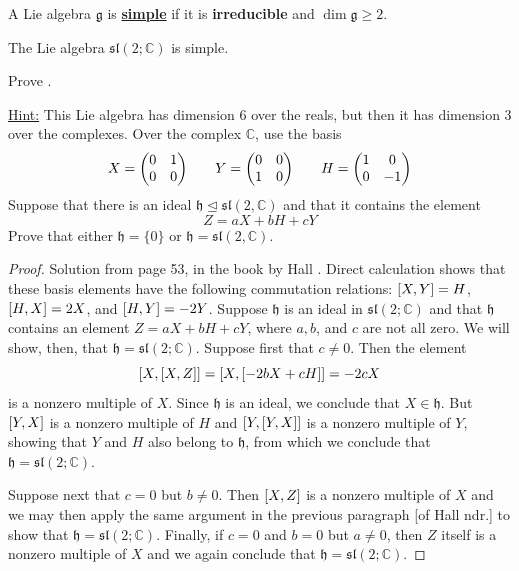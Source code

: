 \documentclass[../main.tex]{subfiles}
\begin{document}
\begin{definition}
A Lie algebra $\mathfrak{g}$ is \underline{\textbf{simple}} if it is \textbf{irreducible} and $\dim\mathfrak{g}\geq 2$.
\end{definition}
\begin{proposition}
The Lie algebra $\mathfrak{sl}(2;\mathbb{C})$ is simple.
\end{proposition}
\begin{exercise}
Prove .

\underline{Hint:} This Lie algebra has dimension 6 over the reals, but then it has dimension 3 over the complexes. Over the complex $\mathbb{C}$, use the basis
\[
X=\mqty(\admat[0]{1,0}) \qquad Y=\mqty(\admat[0]{0,1}) \qquad H=\mqty(\dmat[0]{1,-1})
\]
Suppose that there is an ideal $\mathfrak{h}\trianglelefteq\mathfrak{sl}(2,\mathbb{C})$ and that it contains the element
\[
Z=aX+bH+cY
\]
Prove that either $\mathfrak{h}=\{0\}$ or $\mathfrak{h}=\mathfrak{sl}(2,\mathbb{C})$.
\end{exercise}
\begin{proof}
Solution from page 53, in the book by Hall . Direct calculation shows that these basis elements have the following commutation relations: $\comm{X}{Y}=H$, $\comm{H}{X}=2X$, and $\comm{H}{Y}=-2Y$. Suppose $\mathfrak{h}$ is an ideal in $\mathfrak{sl}(2;\mathbb{C})$ and that $\mathfrak{h}$ contains an element $Z=aX+bH+cY$, where $a,b$, and $c$ are not all zero. We will show, then, that $\mathfrak{h}=\mathfrak{sl}(2;\mathbb{C})$. Suppose first that $c\neq 0$. Then the element
\[
\comm{X}{\comm{X}{Z}}=\comm{X}{[-2bX+cH]}=-2cX
\]
is a nonzero multiple of $X$. Since $\mathfrak{h}$ is an ideal, we conclude that $X\in\mathfrak{h}$. But $\comm{Y}{X}$ is a nonzero multiple of $H$ and $\comm{Y}{\comm{Y}{X}}$ is a nonzero multiple of $Y$, showing that $Y$ and $H$ also belong to $\mathfrak{h}$, from which we conclude that $\mathfrak{h}=\mathfrak{sl}(2;\mathbb{C})$.

Suppose next that $c=0$ but $b\neq 0$. Then $\comm{X}{Z}$ is a nonzero multiple of $X$ and we may then apply the same argument in the previous paragraph [of Hall ndr.] to show that $\mathfrak{h}=\mathfrak{sl}(2;\mathbb{C})$. Finally, if $c=0$ and $b=0$ but $a\neq 0$, then $Z$ itself is a nonzero multiple of $X$ and we again conclude that $\mathfrak{h}=\mathfrak{sl}(2;\mathbb{C})$.
\end{proof}
\end{document}
